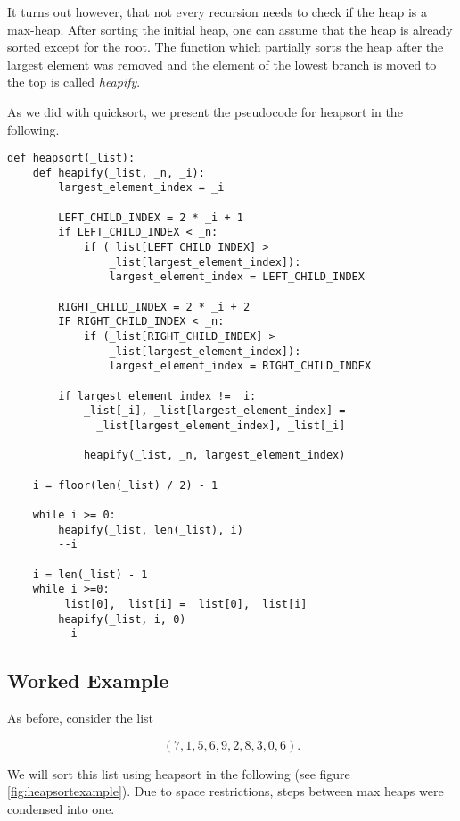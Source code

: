 It turns out however, that not every recursion needs to check if the heap is a max-heap. After sorting the initial heap, one can assume that the heap is already sorted except for the root. The function which partially sorts the heap after the largest element was removed and the element of the lowest branch is moved to the top is called \textit{heapify}.\cite[p.~135]{bib:introductiontoalgorithms} 

As we did with quicksort, we present the pseudocode for heapsort in the following.

\begin{lstlisting}
def heapsort(_list):
    def heapify(_list, _n, _i):
        largest_element_index = _i

        LEFT_CHILD_INDEX = 2 * _i + 1
        if LEFT_CHILD_INDEX < _n:
            if (_list[LEFT_CHILD_INDEX] > 
                _list[largest_element_index]):
                largest_element_index = LEFT_CHILD_INDEX
    
        RIGHT_CHILD_INDEX = 2 * _i + 2
        IF RIGHT_CHILD_INDEX < _n:
            if (_list[RIGHT_CHILD_INDEX] >
                _list[largest_element_index]):
                largest_element_index = RIGHT_CHILD_INDEX
        
        if largest_element_index != _i:
            _list[_i], _list[largest_element_index] =
              _list[largest_element_index], _list[_i]

            heapify(_list, _n, largest_element_index)
            
    i = floor(len(_list) / 2) - 1

    while i >= 0:
        heapify(_list, len(_list), i)
        --i
    
    i = len(_list) - 1
    while i >=0:
        _list[0], _list[i] = _list[0], _list[i]
        heapify(_list, i, 0)
        --i
\end{lstlisting}

\subsection{Worked Example}
As before, consider the list

\begin{equation*}
    (7, 1, 5, 6, 9, 2, 8, 3, 0, 6)\text{.}
\end{equation*}

We will sort this list using heapsort in the following (see figure \ref{fig:heapsortexample}). Due to space restrictions, steps between max heaps were condensed into one.

